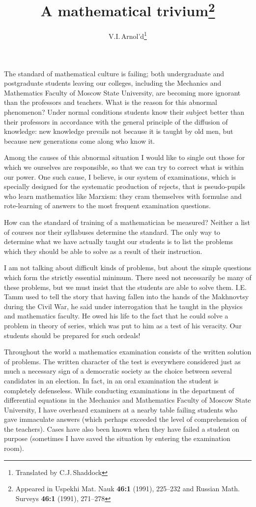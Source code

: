 \documentclass{article}
\title{A mathematical trivium\footnote{Appeared in Uspekhi Mat. Nauk \textbf{46:1} (1991), 225--232 and Russian Math. Surveys \textbf{46:1} (1991), 271--278}}
\author{V.I.\,Arnol'd\footnote{Translated by C.J.\,Shaddock}}
\date{}
\begin{document}
\maketitle

The standard of mathematical culture is failing; both undergraduate and
postgraduate students leaving our colleges, including the Mechanics and
Mathematics Faculty of Moscow State University, are becoming more ignorant than
the professors and teachers. What is the reason for this abnormal phenomenon?
Under normal conditions students know their subject better than their professors
in accordance with the general principle of the diffusion of knowledge: new
knowledge prevails not because it is taught by old men, but because new
generations come along who know it.

Among the causes of this abnormal situation I would like to single out those for
which we ourselves are responsible, so that we can try to correct what is within
our power. One such cause, I believe, is our system of examinations, which is
specially designed for the systematic production of rejects, that is
pseudo-pupils who learn mathematics like Marxism: they cram themselves with
formulae and rote-learning of answers to the most frequent examination
questions.

How can the standard of training of a mathematician be measured? Neither a list
of courses nor their syllabuses determine the standard. The only way to
determine what we have actually taught our students is to list the problems
which they should be able to solve as a result of their instruction.

I am not talking about difficult kinds of problems, but about the simple
questions which form the strictly essential minimum. There need not necessarily
be many of these problems, but we must insist that the students are able to
solve them. I.E.\,Tamm used to tell the story that having fallen into the hands
of the Makhnovtsy during the Civil War, he said under interrogation that he
taught in the physics and mathematics faculty. He owed his life to the fact that
he could solve a problem in theory of series, which was put to him as a test of
his veracity. Our students should be prepared for such ordeals!

Throughout the world a mathematics examination consists of the written solution
of problems. The written character of the test is everywhere considered just as
much a necessary sign of a democratic society as the choice between several
candidates in an election. In fact, in an oral examination the student is
completely defenseless. While conducting examinations in the department of
differential equations in the Mechanics and Mathematics Faculty of Moscow State
University, I have overheard examiners at a nearby table failing students who
gave immaculate answers (which perhaps exceeded the level of comprehension of
the teachers). Cases have also been known when they have failed a student on
purpose (sometimes I have saved the situation by entering the examination room).
\end{document}
